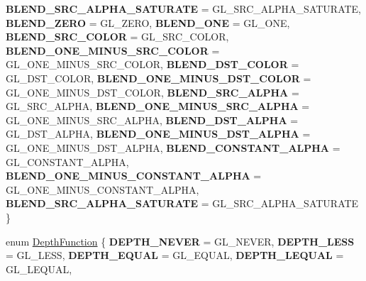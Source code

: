 \begin{DoxyCompactItemize}
\newline
{\bfseries B\+L\+E\+N\+D\+\_\+\+S\+R\+C\+\_\+\+A\+L\+P\+H\+A\+\_\+\+S\+A\+T\+U\+R\+A\+TE} = G\+L\+\_\+\+S\+R\+C\+\_\+\+A\+L\+P\+H\+A\+\_\+\+S\+A\+T\+U\+R\+A\+TE, 
{\bfseries B\+L\+E\+N\+D\+\_\+\+Z\+E\+RO} = G\+L\+\_\+\+Z\+E\+RO, 
{\bfseries B\+L\+E\+N\+D\+\_\+\+O\+NE} = G\+L\+\_\+\+O\+NE, 
{\bfseries B\+L\+E\+N\+D\+\_\+\+S\+R\+C\+\_\+\+C\+O\+L\+OR} = G\+L\+\_\+\+S\+R\+C\+\_\+\+C\+O\+L\+OR, 
\newline
{\bfseries B\+L\+E\+N\+D\+\_\+\+O\+N\+E\+\_\+\+M\+I\+N\+U\+S\+\_\+\+S\+R\+C\+\_\+\+C\+O\+L\+OR} = G\+L\+\_\+\+O\+N\+E\+\_\+\+M\+I\+N\+U\+S\+\_\+\+S\+R\+C\+\_\+\+C\+O\+L\+OR, 
{\bfseries B\+L\+E\+N\+D\+\_\+\+D\+S\+T\+\_\+\+C\+O\+L\+OR} = G\+L\+\_\+\+D\+S\+T\+\_\+\+C\+O\+L\+OR, 
{\bfseries B\+L\+E\+N\+D\+\_\+\+O\+N\+E\+\_\+\+M\+I\+N\+U\+S\+\_\+\+D\+S\+T\+\_\+\+C\+O\+L\+OR} = G\+L\+\_\+\+O\+N\+E\+\_\+\+M\+I\+N\+U\+S\+\_\+\+D\+S\+T\+\_\+\+C\+O\+L\+OR, 
{\bfseries B\+L\+E\+N\+D\+\_\+\+S\+R\+C\+\_\+\+A\+L\+P\+HA} = G\+L\+\_\+\+S\+R\+C\+\_\+\+A\+L\+P\+HA, 
\newline
{\bfseries B\+L\+E\+N\+D\+\_\+\+O\+N\+E\+\_\+\+M\+I\+N\+U\+S\+\_\+\+S\+R\+C\+\_\+\+A\+L\+P\+HA} = G\+L\+\_\+\+O\+N\+E\+\_\+\+M\+I\+N\+U\+S\+\_\+\+S\+R\+C\+\_\+\+A\+L\+P\+HA, 
{\bfseries B\+L\+E\+N\+D\+\_\+\+D\+S\+T\+\_\+\+A\+L\+P\+HA} = G\+L\+\_\+\+D\+S\+T\+\_\+\+A\+L\+P\+HA, 
{\bfseries B\+L\+E\+N\+D\+\_\+\+O\+N\+E\+\_\+\+M\+I\+N\+U\+S\+\_\+\+D\+S\+T\+\_\+\+A\+L\+P\+HA} = G\+L\+\_\+\+O\+N\+E\+\_\+\+M\+I\+N\+U\+S\+\_\+\+D\+S\+T\+\_\+\+A\+L\+P\+HA, 
{\bfseries B\+L\+E\+N\+D\+\_\+\+C\+O\+N\+S\+T\+A\+N\+T\+\_\+\+A\+L\+P\+HA} = G\+L\+\_\+\+C\+O\+N\+S\+T\+A\+N\+T\+\_\+\+A\+L\+P\+HA, 
\newline
{\bfseries B\+L\+E\+N\+D\+\_\+\+O\+N\+E\+\_\+\+M\+I\+N\+U\+S\+\_\+\+C\+O\+N\+S\+T\+A\+N\+T\+\_\+\+A\+L\+P\+HA} = G\+L\+\_\+\+O\+N\+E\+\_\+\+M\+I\+N\+U\+S\+\_\+\+C\+O\+N\+S\+T\+A\+N\+T\+\_\+\+A\+L\+P\+HA, 
{\bfseries B\+L\+E\+N\+D\+\_\+\+S\+R\+C\+\_\+\+A\+L\+P\+H\+A\+\_\+\+S\+A\+T\+U\+R\+A\+TE} = G\+L\+\_\+\+S\+R\+C\+\_\+\+A\+L\+P\+H\+A\+\_\+\+S\+A\+T\+U\+R\+A\+TE
 \}
\item 
enum \hyperlink{classRenderState_a36d3d228500feb75244c2c761c42b231}{Depth\+Function} \{ \newline
{\bfseries D\+E\+P\+T\+H\+\_\+\+N\+E\+V\+ER} = G\+L\+\_\+\+N\+E\+V\+ER, 
{\bfseries D\+E\+P\+T\+H\+\_\+\+L\+E\+SS} = G\+L\+\_\+\+L\+E\+SS, 
{\bfseries D\+E\+P\+T\+H\+\_\+\+E\+Q\+U\+AL} = G\+L\+\_\+\+E\+Q\+U\+AL, 
{\bfseries D\+E\+P\+T\+H\+\_\+\+L\+E\+Q\+U\+AL} = G\+L\+\_\+\+L\+E\+Q\+U\+AL, 
\newline

\end{DoxyCompactItemize}
